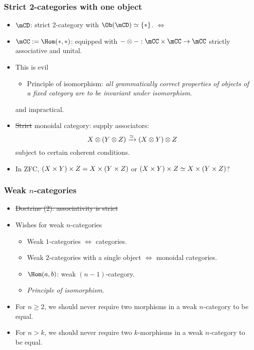 \begin{frame}
	\frametitle{Strict 2-categories with one object}

	\begin{itemize}
		\item<1->
			$\mCD$: strict 2-category with $\Ob(\mCD) \simeq \{*\}$.  $\Leftrightarrow$
		\item<2->
			$\mCC:=\Hom(*,*)$: equipped with $-\ot-:\mCC\mt \mCC \to \mCC$ \alert{strictly} associative and unital. 
		\item<3->
			This is \alert{evil}
			\begin{itemize}
				\item[] Principle of isomorphism: \emph{all grammatically correct properties of objects of a fixed category are to be invariant under isomorphism}.\pause
			\end{itemize}
			and \alert{impractical}. \pause



		\item<4->
			\st{Strict} \alert{monoidal category}: supply \alert{associators}:
			\[
				X\ot (Y\ot Z) \xrightarrow{\simeq} (X\ot Y) \ot Z
			\]
			subject to certain coherent conditions.
		\item<3->[]

			\begin{exe}
				In ZFC, $(X\mt Y)\mt Z=X \mt(Y\mt Z)$ or $(X\mt Y)\mt Z \simeq X \mt(Y\mt Z)$?
			\end{exe}

	\end{itemize}

\end{frame}

\begin{frame}
	\frametitle{Weak $n$-categories}

	\begin{itemize}
		\item
			\st{Doctrine (2): associativity is strict} \pause
		\item
			Wishes for weak $n$-categories
			\begin{itemize}
				\item 
					Weak $1$-categories $\Leftrightarrow$ categories. \pause
				\item
					Weak $2$-categories with a single object $\Leftrightarrow$ monoidal categories. \pause
				\item
					$\Hom(a,b)$: weak $(n-1)$-category. \pause
				\item
					\emph{Principle of isomorphism}. \pause
			\end{itemize}
		\item
			For $n\ge 2$, we should never require two morphisms in a weak $n$-category to be \alert{equal}. \pause
		\item
			For $n> k$, we should never require two $k$-morphisms in a weak $n$-category to be \alert{equal}.
	\end{itemize}

\end{frame}

